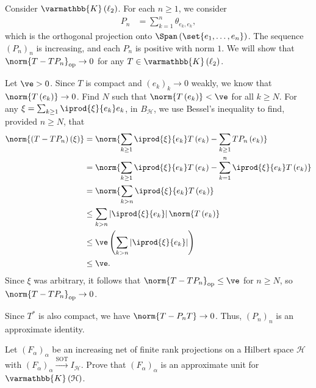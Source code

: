 \documentclass[10pt]{mypackage}
\renewcommand*{\mathbb}[1]{\varmathbb{#1}}
\newcommand{\K}{\mathbb{K}}
\DeclareMathOperator{\op}{op}
\begin{document}
\begin{example}
  Consider $\K\left(\ell_2\right)$. For each $n\geq 1$, we consider
  \begin{align*}
    P_n &= \sum_{k = 1}^{n}\theta_{e_k,e_k},
  \end{align*}
  which is the orthogonal projection onto $\Span\left(\set{e_1,\dots,e_n}\right)$. The sequence $\left(P_n\right)_n$ is increasing, and each $P_n$ is positive with norm $1$. We will show that $\norm{T-TP_n}_{\op} \rightarrow 0$ for any $T\in \K\left(\ell_2\right)$.\newline

  Let $\ve > 0$. Since $T$ is compact and $\left(e_k\right)_k\rightarrow 0$ weakly, we know that $\norm{T\left(e_k\right)}\rightarrow 0$. Find $N$ such that $\norm{T\left(e_k\right)} < \ve$ for all $k\geq N$. For any $\xi = \sum_{k\geq 1} \iprod{\xi}{e_k}e_k$, in $B_{\mathcal{H}}$, we use Bessel's inequality to find, provided $n\geq N$, that
  \begin{align*}
    \norm{\left(T - TP_n\right)\left(\xi\right)} &= \norm{\sum_{k\geq 1} \iprod{\xi}{e_k}T\left(e_k\right) - \sum_{k\geq 1}TP_n\left(e_k\right)}\\
                                                 &= \norm{\sum_{k\geq 1} \iprod{\xi}{e_k}T\left(e_k\right) - \sum_{k=1}^{n} \iprod{\xi}{e_k}T\left(e_k\right)}\\
                                                 &= \norm{\sum_{k > n} \iprod{\xi}{e_k}T\left(e_k\right)}\\
                                                 &\leq \sum_{k > n} \left\vert \iprod{\xi}{e_k} \right\vert\norm{T\left(e_k\right)}\\
                                                 &\leq \ve \left(\sum_{k > n} \left\vert \iprod{\xi}{e_k} \right\vert\right)\\
                                                 &\leq \ve.
  \end{align*}
  Since $\xi$ was arbitrary, it follows that $\norm{T - TP_n}_{\op} \leq \ve$ for $n\geq N$, so $\norm{T-TP_n}_{\op} \rightarrow 0$.\newline

  Since $T^{\ast}$ is also compact, we have $\norm{T - P_nT}\rightarrow 0$. Thus, $\left(P_n\right)_n$ is an approximate identity.
\end{example}
\begin{exercise}
  Let $\left(F_{\alpha}\right)_{\alpha}$ be an increasing net of finite rank projections on a Hilbert space $\mathcal{H}$ with $\left(F_{\alpha}\right)_{\alpha}\xrightarrow{\text{SOT}}I_{\mathcal{H}}$. Prove that $\left(F_{\alpha}\right)_{\alpha}$ is an approximate unit for $\K\left(\mathcal{H}\right)$.
\end{exercise}
\end{document}
